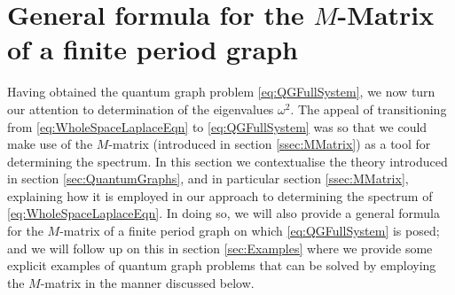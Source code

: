 \section{General formula for the $M$-Matrix of a finite period graph} \label{sec:Discussion}
Having obtained the quantum graph problem \eqref{eq:QGFullSystem}, we now turn our attention to determination of the eigenvalues $\omega^2$.
The appeal of transitioning from \eqref{eq:WholeSpaceLaplaceEqn} to \eqref{eq:QGFullSystem} was so that we could make use of the $M$-matrix (introduced in section \ref{ssec:MMatrix}) as a tool for determining the spectrum.
In this section we contextualise the theory introduced in section \ref{sec:QuantumGraphs}, and in particular section \ref{ssec:MMatrix}, explaining how it is employed in our approach to determining the spectrum of \eqref{eq:WholeSpaceLaplaceEqn}.
In doing so, we will also provide a general formula for the $M$-matrix of a finite period graph on which \eqref{eq:QGFullSystem} is posed; and we will follow up on this in section \ref{sec:Examples} where we provide some explicit examples of quantum graph problems that can be solved by employing the $M$-matrix in the manner discussed below. \newline

